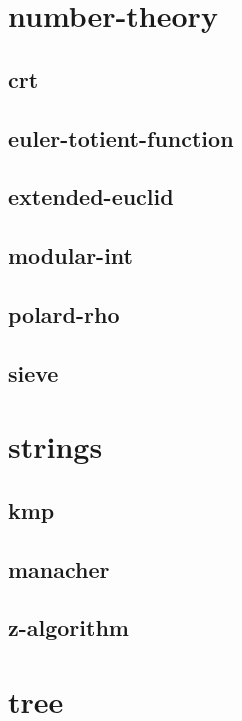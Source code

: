 \documentclass[a4paper, twocolumn]{article}
\begin{document}
\section{number-theory}
\subsection{crt}

\subsection{euler-totient-function}

\subsection{extended-euclid}

\subsection{modular-int}

\subsection{polard-rho}

\subsection{sieve}

\section{strings}
\subsection{kmp}

\subsection{manacher}

\subsection{z-algorithm}

\section{tree}
\end{document}
